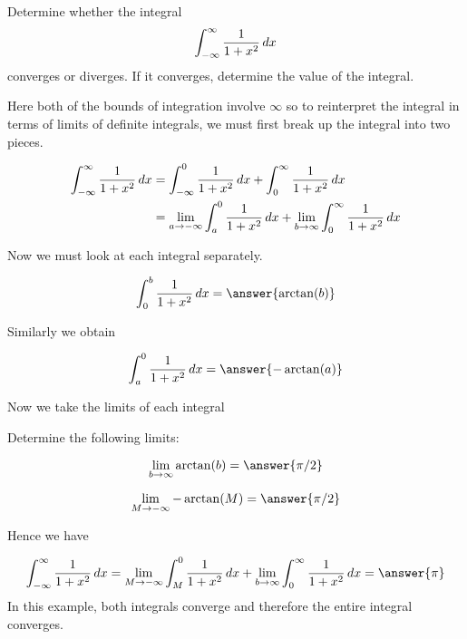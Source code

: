 \documentclass{ximera}
\begin{document}
\begin{example}
Determine whether the integral
\[
\int_{-\infty}^{\infty} \frac{1}{1+x^2} \mathop{}\!d x 
\]
converges or diverges. If it converges, determine the value of the integral. 
\begin{explanation}
Here both of the bounds of integration involve $\infty$ so to reinterpret the integral in terms of limits of definite integrals, 
we must first break up the integral into two pieces.

\begin{align*}
\int_{-\infty}^{\infty} \frac{1}{1+x^2} \mathop{}\!d x&= \int_{-\infty}^{0} \frac{1}{1+x^2} \mathop{}\!d x + \int_{0}^{\infty} \frac{1}{1+x^2} \mathop{}\!d x \\
& =\lim_{a \to -\infty} \int_{a}^{0} \frac{1}{1+x^2} \mathop{}\!d x + \lim_{b \to \infty} \int_{0}^{\infty} \frac{1}{1+x^2} \mathop{}\!d x 
\end{align*}
 
Now we must look at each integral separately. 

\[
\int_{0}^{b} \frac{1}{1+x^2} \d x =  \answer{\arctan(b)}
\]


Similarly we obtain

\[
\int_{a}^{0} \frac{1}{1+x^2} \d x= \answer{-\arctan(a)}
\]
 

Now we take the limits of each integral

\begin{question}
Determine the following limits:

 \begin{prompt}
   \[
    \lim_{b\to\infty} \arctan(b) = \answer{\pi/2}
    \]

\[
\lim_{M \to -\infty} -\arctan(M)=\answer{\pi/2}
\]
  \end{prompt}
\end{question}

Hence we have

\[
\int_{-\infty}^{\infty} \frac{1}{1+x^2} \d x=\lim_{M \to -\infty} \int_{M}^{0} \frac{1}{1+x^2} \d x + \lim_{b \to \infty} \int_{0}^{\infty} \frac{1}{1+x^2} \d x =\answer{ \pi}
\]
In this example, both integrals converge and therefore the entire integral converges. 
\end{explanation}
\end{example}
\end{document}
